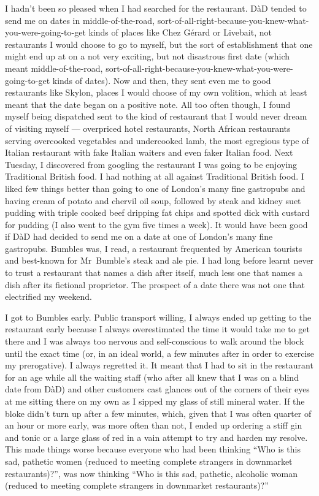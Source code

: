 I hadn't been so pleased when I had searched for the restaurant.
D{\`a}D tended to send me on dates in
middle-of-the-road, sort-of-all-right-because-you-knew-what-you-were-going-to-get kinds of places like Chez
G{\'e}rard or Livebait, not restaurants I would choose to go to myself, but the sort of establishment that one might end up at on a not very exciting, but not disastrous first date (which meant middle-of-the-road, sort-of-all-right-because-you-knew-what-you-were-going-to-get kinds of dates).
Now and then, they sent even me to good restaurants like Skylon, places I would choose of my own volition, which at least meant that the date began on a positive note. All too often though, I found
myself being dispatched sent to the kind of restaurant that I would
never dream of visiting myself --- overpriced hotel restaurants, North African restaurants serving overcooked vegetables and undercooked lamb, the most egregious type
of Italian restaurant with fake Italian waiters and even faker
Italian food. Next Tuesday, I discovered from googling the restaurant I was going to be enjoying Traditional British
food. I had nothing at all against Traditional British food. I liked few
things better than going to one of London's many fine
gastropubs and having cream of potato and chervil oil soup, followed
by steak and kidney suet pudding with triple cooked beef dripping fat chips and spotted dick
with custard for pudding (I also went to the gym five times a week). It would have been good if D{\`a}D
had decided to send me on a date at one of London's many fine gastropubs. Bumbles was, I read, a restaurant frequented by American tourists and
best-known for Mr~Bumble's steak and ale {\twelveit pie}. I had long before learnt never to
trust a restaurant that names a dish after itself, much less one that names a dish after its fictional proprietor. The prospect of a date there was not one that electrified my weekend.

I got to Bumbles early. Public transport willing, I always ended up getting to the restaurant early
because I always overestimated the time it would take me to get there and I was always too nervous and self-conscious to walk around the block
until the exact time (or, in an ideal world, a few minutes after in order to exercise my prerogative). I always regretted it. It meant that I had to
sit in the restaurant for an age while all the waiting staff (who
after all knew that I was on a blind date from D{\`a}D)
and other customers cast glances out of the corners of their
eyes at me sitting there on my own as I sipped my glass of still mineral
water. If the bloke didn't turn up after a few minutes, which, given
that I was often quarter of an hour or more early, was more often than
not, I ended up ordering a stiff gin and tonic or a large glass of
red in a vain attempt to try and harden my resolve. This made things
worse because everyone who had been thinking ``Who is this sad,
pathetic women (reduced to meeting complete strangers in downmarket
restaurants)?'', was now thinking ``Who is this sad, pathetic,
{\twelveit alcoholic\/} woman (reduced to meeting complete strangers in downmarket restaurants)?''

